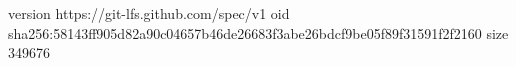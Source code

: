 version https://git-lfs.github.com/spec/v1
oid sha256:58143ff905d82a90c04657b46de26683f3abe26bdcf9be05f89f31591f2f2160
size 349676
